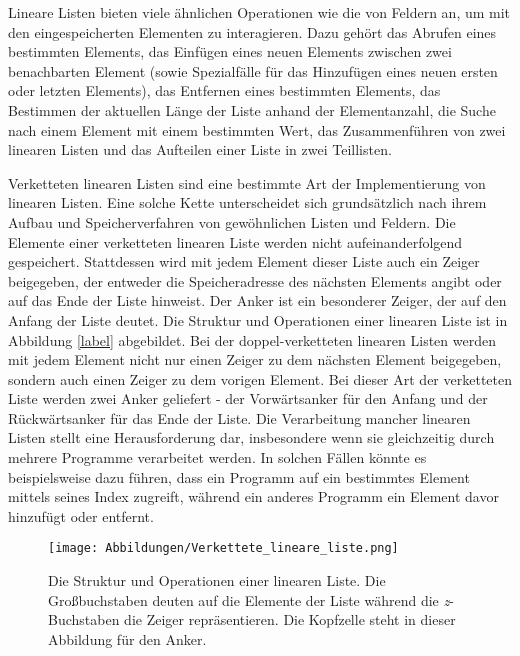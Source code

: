 Lineare Listen bieten viele ähnlichen Operationen wie die von Feldern an, um mit den eingespeicherten Elementen zu interagieren. Dazu gehört das Abrufen eines bestimmten Elements, das Einfügen eines neuen Elements zwischen zwei benachbarten Element (sowie Spezialfälle für das Hinzufügen eines neuen ersten oder letzten Elements), das Entfernen eines bestimmten Elements, das Bestimmen der aktuellen Länge der Liste anhand der Elementanzahl, die Suche nach einem Element mit einem bestimmten Wert, das Zusammenführen von zwei linearen Listen und das Aufteilen einer Liste in zwei Teillisten.\autocite[42-43]{ollmert_datenstrukturen_2020}


Verketteten linearen Listen sind eine bestimmte Art der Implementierung von linearen Listen. Eine solche Kette unterscheidet sich grundsätzlich nach ihrem Aufbau und Speicherverfahren von gewöhnlichen Listen und Feldern. Die Elemente einer verketteten linearen Liste werden nicht aufeinanderfolgend gespeichert. Stattdessen wird mit jedem Element dieser Liste auch ein Zeiger beigegeben, der entweder die Speicheradresse des nächsten Elements angibt oder auf das Ende der Liste hinweist. Der Anker ist ein besonderer Zeiger, der auf den Anfang der Liste deutet. Die Struktur und Operationen einer linearen Liste ist in Abbildung \ref{label} abgebildet. Bei der doppel-verketteten linearen Listen werden mit jedem Element nicht nur einen Zeiger zu dem nächsten Element beigegeben, sondern auch einen Zeiger zu dem vorigen Element. Bei dieser Art der verketteten Liste werden zwei Anker geliefert - der Vorwärtsanker für den Anfang und der Rückwärtsanker für das Ende der Liste. Die Verarbeitung mancher linearen Listen stellt eine Herausforderung dar, insbesondere wenn sie gleichzeitig durch mehrere Programme verarbeitet werden. In solchen Fällen könnte es beispielsweise dazu führen, dass ein Programm auf ein bestimmtes Element mittels seines Index zugreift, während ein anderes Programm ein Element davor hinzufügt oder entfernt. \autocite[43-44]{ollmert_datenstrukturen_2020}

\begin{figure}[t]
	\texttt{[image: Abbildungen/Verkettete\_lineare\_liste.png]}
	\centering
	\caption{Die Struktur und Operationen einer linearen Liste. Die Großbuchstaben deuten auf die Elemente der Liste während die \textit{z}-Buchstaben die Zeiger repräsentieren. Die Kopfzelle steht in dieser Abbildung für den Anker.\autocite[611]{ernst_grundkurs_2020}}
\end{figure}

